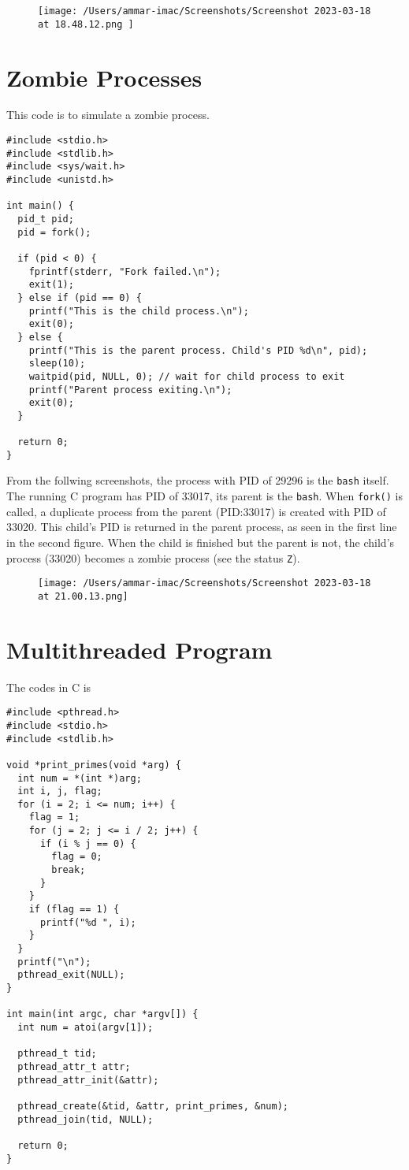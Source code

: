 \documentclass{article}
\def\c#1{\texttt{#1}}
\begin{document}
\begin{figure}[ht]
	\centering
	\texttt{[image: /Users/ammar-imac/Screenshots/Screenshot 2023-03-18 at 18.48.12.png ]}
\end{figure}

\section{Zombie Processes}%
This code is to simulate a zombie process.

\begin{verbatim}
#include <stdio.h>
#include <stdlib.h>
#include <sys/wait.h>
#include <unistd.h>

int main() {
  pid_t pid;
  pid = fork();

  if (pid < 0) {
    fprintf(stderr, "Fork failed.\n");
    exit(1);
  } else if (pid == 0) {
    printf("This is the child process.\n");
    exit(0);
  } else {
    printf("This is the parent process. Child's PID %d\n", pid);
    sleep(10);
    waitpid(pid, NULL, 0); // wait for child process to exit
    printf("Parent process exiting.\n");
    exit(0);
  }

  return 0;
}
\end{verbatim}


\newpage

From the follwing screenshots, the process with PID of 29296 is the \c{bash} itself.
The running C program has PID of 33017, its parent is the \c{bash}. When \c{fork()} is called,
a duplicate process from the parent (PID:33017) is created with PID of 33020. This child's PID is returned
in the parent process, as seen in the first line in the second figure. When the child is finished but
the parent is not, the child's process (33020) becomes a zombie process (see the status \c{Z}).

\begin{figure}[ht]
	\centering
	\texttt{[image: /Users/ammar-imac/Screenshots/Screenshot 2023-03-18 at 21.00.13.png]}
\end{figure}


\section{Multithreaded Program}%

The codes in C is
\begin{verbatim}
#include <pthread.h>
#include <stdio.h>
#include <stdlib.h>

void *print_primes(void *arg) {
  int num = *(int *)arg;
  int i, j, flag;
  for (i = 2; i <= num; i++) {
    flag = 1;
    for (j = 2; j <= i / 2; j++) {
      if (i % j == 0) {
        flag = 0;
        break;
      }
    }
    if (flag == 1) {
      printf("%d ", i);
    }
  }
  printf("\n");
  pthread_exit(NULL);
}

int main(int argc, char *argv[]) {
  int num = atoi(argv[1]);

  pthread_t tid;
  pthread_attr_t attr;
  pthread_attr_init(&attr);

  pthread_create(&tid, &attr, print_primes, &num);
  pthread_join(tid, NULL);

  return 0;
}
\end{verbatim}
\end{document}
